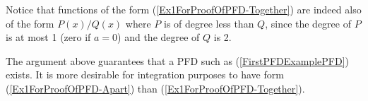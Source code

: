 \eex
{}

Notice that functions of the form (\ref{Ex1ForProofOfPFD-Together})
are indeed also of the form $P(x)/Q(x)$ where $P$ is of degree
less than $Q$, since the degree of $P$ is at most 1 (zero if $a=0$) and the
degree of $Q$ is 2.

The argument above guarantees that a PFD such as 
(\ref{FirstPFDExamplePFD}) exists.  It is more desirable
for integration purposes to have form (\ref{Ex1ForProofOfPFD-Apart})
than (\ref{Ex1ForProofOfPFD-Together}).

